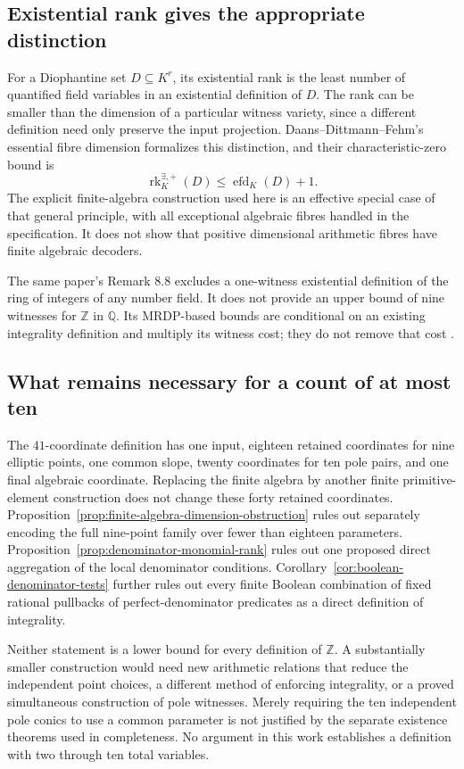 \subsection{Existential rank gives the appropriate distinction}

For a Diophantine set $D\subseteq K^r$, its existential rank is the
least number of quantified field variables in an existential definition
of $D$.  The rank can be smaller than the dimension of a particular
witness variety, since a different definition need only preserve the
input projection.  Daans--Dittmann--Fehm's essential fibre dimension
formalizes this distinction, and their characteristic-zero bound is
\cite[Corollary 4.21]{P3DDF2025}
\[
             \operatorname{rk}^{\exists,+}_K(D)
                    \le\operatorname{efd}_K(D)+1.
\]
The explicit finite-algebra construction used here is an effective
special case of that general principle, with all exceptional algebraic
fibres handled in the specification.  It does not show that positive
dimensional arithmetic fibres have finite algebraic decoders.

The same paper's Remark 8.8 excludes a one-witness existential definition
of the ring of integers of any number field.  It does not provide an
upper bound of nine witnesses for $\mathbb Z$ in $\mathbb Q$.
Its MRDP-based bounds are conditional on an existing integrality
definition and multiply its witness cost; they do not remove that
cost \cite[Remark 8.23]{P3DDF2025}.

\subsection{What remains necessary for a count of at most ten}

The $41$-coordinate definition has one input, eighteen retained
coordinates for nine elliptic points, one common slope, twenty
coordinates for ten pole pairs, and one final algebraic coordinate.
Replacing the finite algebra by another finite primitive-element
construction does not change these forty retained coordinates.
Proposition~\ref{prop:finite-algebra-dimension-obstruction} rules out
separately encoding the full nine-point family over fewer than eighteen
parameters.  Proposition~\ref{prop:denominator-monomial-rank} rules out
one proposed direct aggregation of the local denominator conditions.
Corollary~\ref{cor:boolean-denominator-tests} further rules out every
finite Boolean combination of fixed rational pullbacks of
perfect-denominator predicates as a direct definition of integrality.

Neither statement is a lower bound for every definition of
$\mathbb Z$.  A substantially smaller construction would need new
arithmetic relations that reduce the independent point choices, a
different method of enforcing integrality, or a proved simultaneous
construction of pole witnesses.  Merely requiring the ten independent
pole conics to use a common parameter is not justified by the separate
existence theorems used in completeness.  No argument in this work
establishes a definition with two through ten total variables.
